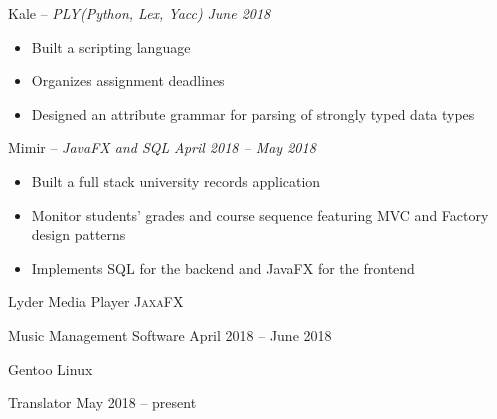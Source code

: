 \documentclass[10pt,letterpaper]{article} %
\begin{document}

\headedsection 
{Kale -- \textit{PLY(Python, Lex, Yacc)}}
{\textit{June 2018}} {
\begin{itemize}
  \setlength\itemsep{-0.3em}
  \item Built a scripting language
  \item Organizes assignment deadlines
  \item Designed an attribute grammar for parsing of strongly typed data types
\end{itemize}
}


\headedsection 
{Mimir -- \textit{JavaFX and SQL}}
{\textit{April 2018 -- May 2018}} {
\begin{itemize}
  \setlength\itemsep{-0.3em}
  \item Built a full stack university records application
  \item Monitor students' grades and course sequence featuring MVC and Factory design patterns
  \item Implements SQL for the backend and JavaFX for the frontend
\end{itemize}
}


\headedsection 
{Lyder Media Player}
{\textsc{JaxaFX}} {

\headedsubsection 
{Music Management Software}
{April 2018 -- June 2018}
{}
}

\spacedhrule{0em}{-0.9em} 



\headedsection
{Gentoo Linux}
{} {

\headedsubsection
{Translator}
{May 2018 -- present}
{}
}

\end{document}
